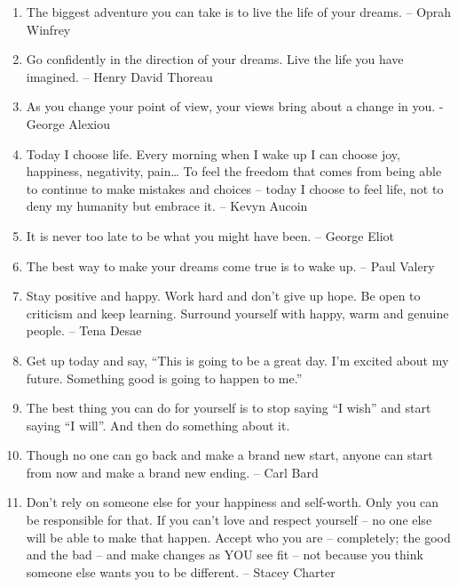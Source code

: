 \begin{enumerate}
            \item The biggest adventure you can take is to live the life of your dreams. – Oprah Winfrey

            \item Go confidently in the direction of your dreams. Live the life you have imagined. – Henry David Thoreau

            \item As you change your point of view, your views bring about a change in you. -George Alexiou

            \item Today I choose life. Every morning when I wake up I can choose joy, happiness, negativity, pain… To feel the freedom that comes from being able to continue to make mistakes and choices – today I choose to feel life, not to deny my humanity but embrace it. – Kevyn Aucoin

            \item It is never too late to be what you might have been. – George Eliot

            \item The best way to make your dreams come true is to wake up. – Paul Valery

            \item Stay positive and happy. Work hard and don’t give up hope. Be open to criticism and keep learning. Surround yourself with happy, warm and genuine people. – Tena Desae

            \item Get up today and say, “This is going to be a great day. I’m excited about my future. Something good is going to happen to me.”

            \item The best thing you can do for yourself is to stop saying “I wish” and start saying “I will”. And then do something about it.

            \item Though no one can go back and make a brand new start, anyone can start from now and make a brand new ending. – Carl Bard

            \item Don’t rely on someone else for your happiness and self-worth. Only you can be responsible for that. If you can’t love and respect yourself – no one else will be able to make that happen. Accept who you are – completely; the good and the bad – and make changes as YOU see fit – not because you think someone else wants you to be different. – Stacey Charter


\end{enumerate}
